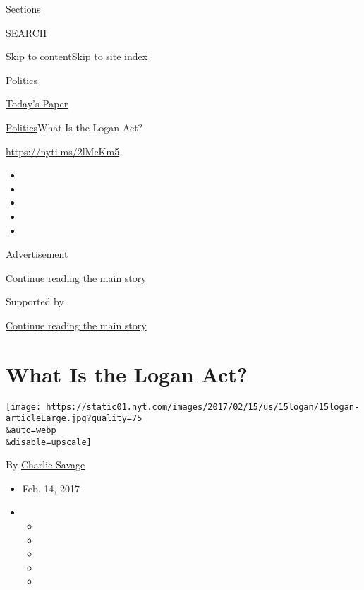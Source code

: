 Sections

SEARCH

\protect\hyperlink{site-content}{Skip to
content}\protect\hyperlink{site-index}{Skip to site index}

\href{https://www.nytimes.com/section/politics}{Politics}

\href{https://myaccount.nytimes.com/auth/login?response_type=cookie\&client_id=vi}{}

\href{https://www.nytimes.com/section/todayspaper}{Today's Paper}

\href{/section/politics}{Politics}\textbar{}What Is the Logan Act?

\url{https://nyti.ms/2lMeKm5}

\begin{itemize}
\item
\item
\item
\item
\item
\end{itemize}

Advertisement

\protect\hyperlink{after-top}{Continue reading the main story}

Supported by

\protect\hyperlink{after-sponsor}{Continue reading the main story}

\hypertarget{what-is-the-logan-act}{%
\section{What Is the Logan Act?}\label{what-is-the-logan-act}}

\texttt{[image: https://static01.nyt.com/images/2017/02/15/us/15logan/15logan-articleLarge.jpg?quality=75\\\&auto=webp\\\&disable=upscale]}

By \href{http://www.nytimes.com/by/charlie-savage}{Charlie Savage}

\begin{itemize}
\item
  Feb. 14, 2017
\item
  \begin{itemize}
  \item
  \item
  \item
  \item
  \item
  \end{itemize}
\end{itemize}

